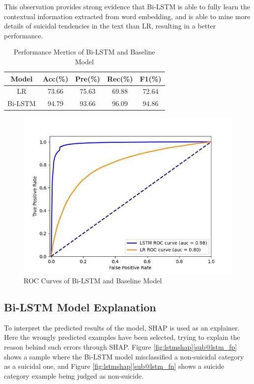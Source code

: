 \documentclass[ %
                    author={Bocheng Wang},
                supervisor={Dr. Qiang Liu},
                    degree={MSc},
                     title={A Research on Identification of Suicide Ideation in Texts with Multiple Models},
                      type={},
                      year={2024}]{dissertation}
\begin{document}
This observation provides strong evidence that Bi-LSTM is able to fully learn the contextual information extracted from word embedding, and is able to mine more details of suicidal tendencies in the text than LR, resulting in a better performance.

\begin{table}[!h]
      \centering
      \begin{tabular}{c|cccc}
            \hline
            Model & Acc(\%) & Pre(\%) & Rec(\%) & F1(\%) \\
            \hline
            LR      & 73.66 & 75.63 & 69.88 & 72.64 \\
            Bi-LSTM & 94.79 & 93.66 & 96.09 & 94.86 \\
            \hline
      \end{tabular}
      \caption{Performance Mertics of Bi-LSTM and Baseline Model}
      \label{tab:lstmmetrics}
\end{table}

\begin{figure}[h]
      \centering
      \includegraphics[width=0.48\linewidth]{../img/roc_LRb&LSTM.jpg}
      \caption{ROC Curves of Bi-LSTM and Baseline Model}
      \label{fig:rocLRLSTM}
\end{figure}

\subsection{Bi-LSTM Model Explanation}
\noindent
To interpret the predicted results of the model, SHAP is used as an explainer. Here the wrongly predicted examples have been selected, trying to explain the reason behind such errors through SHAP. Figure \ref{fig:lstmshap}\ref{sub@lstm_fp} shows a sample where the Bi-LSTM model misclassified a non-suicidal category as a suicidal one, and Figure \ref{fig:lstmshap}\ref{sub@lstm_fn} shows a suicide category example being judged as non-suicide.
\end{document}
